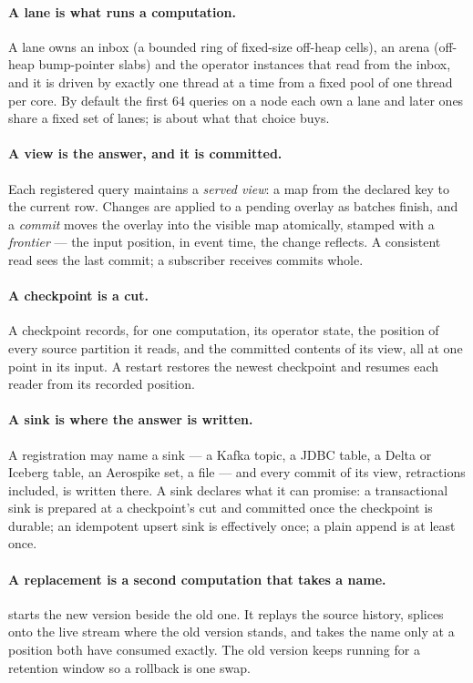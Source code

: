 \documentclass[11pt,a4paper]{article}
\renewcommand{\_}{\oldunderscore\allowbreak}
\newcommand{\code}[1]{\texttt{\pvbreakable{#1}}}
\begin{document}
\paragraph{A lane is what runs a computation.} A lane owns an inbox (a bounded ring of fixed-size
off-heap cells), an arena (off-heap bump-pointer slabs) and the operator instances that read from the
inbox, and it is driven by exactly one thread at a time from a fixed pool of one thread per core. By
default the first 64 queries on a node each own a lane and later ones share a fixed set of lanes;
 is about what that choice buys.

\paragraph{A view is the answer, and it is committed.} Each registered query maintains a
\emph{served view}: a map from the declared key to the current row. Changes are applied to a pending
overlay as batches finish, and a \emph{commit} moves the overlay into the visible map atomically,
stamped with a \emph{frontier} --- the input position, in event time, the change reflects. A
consistent read sees the last commit; a subscriber receives commits whole.

\paragraph{A checkpoint is a cut.} A checkpoint records, for one computation, its operator state,
the position of every source partition it reads, and the committed contents of its view, all at one
point in its input. A restart restores the newest checkpoint and resumes each reader from its
recorded position.

\paragraph{A sink is where the answer is written.} A registration may name a sink --- a Kafka topic,
a JDBC table, a Delta or Iceberg table, an Aerospike set, a file --- and every commit of its view,
retractions included, is written there. A sink declares what it can promise: a transactional sink is
prepared at a checkpoint's cut and committed once the checkpoint is durable; an idempotent upsert
sink is effectively once; a plain append is at least once.

\paragraph{A replacement is a second computation that takes a name.} \code{CREATE OR REPLACE
CONTINUOUS QUERY} starts the new version beside the old one. It replays the source history, splices
onto the live stream where the old version stands, and takes the name only at a position both have
consumed exactly. The old version keeps running for a retention window so a rollback is one swap.
\end{document}
